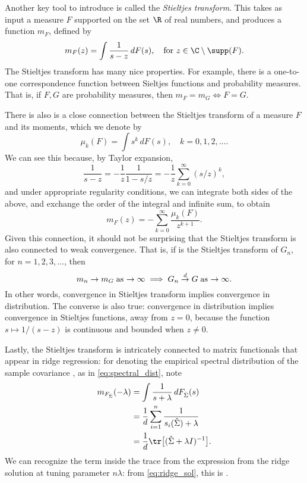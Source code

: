 \documentclass{article}
\begin{document}
Another key tool to introduce is called the \emph{Stieltjes transform}. This
takes as input a measure $F$ supported on the set $\R$ of real numbers, and 
produces a function $m_F$, defined by   
\begin{equation}
\label{eq:stieltjes}
m_F(z) = \int \frac{1}{s - z} \, dF(s), \quad \text{for $z \in \C \setminus
  \supp(F)$}.  
\end{equation}
The Stieltjes transform has many nice properties. For example, there is a
one-to-one correspondence function between Sieltjes functions and probability
measures. That is, if $F,G$ are probability measures, then $m_F = m_G \iff F =
G$.  

There is also is a close connection between the Stieltjes transform of a measure
$F$ and its moments, which we denote by
\[
\mu_k(F) = \int s^k \, dF(s), \quad k=0,1,2,\dots.
\]
We can see this because, by Taylor expansion,
\[
\frac{1}{s - z} = -\frac{1}{z} \frac{1}{1 - s/z} = -\frac{1}{z}
\sum_{k=0}^\infty (s/z)^k, 
\]
and under appropriate regularity conditions, we can integrate both sides of the
above, and exchange the order of the integral and infinite sum, to obtain 
\[
m_F(z) = - \sum_{k=0}^\infty \frac{\mu_k(F)}{z^{k+1}}. 
\]
Given this connection, it should not be surprising that the Stieltjes
transform is also connected to weak convergence. That is, if  is the Stieltjes transform of $G_n$, for $n=1,2,3,\dots$, then  
\[
m_n \to m_G \; \text{as $\to \infty$} \implies G_n \overset{d}{\to} G \; \text{as $\to
  \infty$}.  
\]
In other words, convergence in Stieltjes transform implies convergence in 
distribution. The converse is also true: convergence in distribution implies
convergence in Stieltjes functions, away from $z=0$, because the function $s
\mapsto 1/(s-z)$ is continuous and bounded when $z \not= 0$.     

Lastly, the Stieltjes transform is intricately connected to matrix functionals
that appear in ridge regression: for  denoting the
empirical spectral distribution of the sample covariance , as in \eqref{eq:spectral_dist}, note 
\begin{align*}
m_{F_{\hSigma}}(-\lambda) 
&= \int \frac{1}{s+\lambda} \, dF_{\hSigma} (s) \\
&= \frac{1}{d} \sum_{i=1}^n \frac{1}{s_i(\hSigma) + \lambda} \\ 
&= \frac{1}{d} \tr\big[ (\hSigma + \lambda I)^{-1} \big].
\end{align*}
We can recognize the term inside the trace from the expression from the ridge
solution at tuning parameter $n\lambda$: from \eqref{eq:ridge_sol}, this is
.
\end{document}
